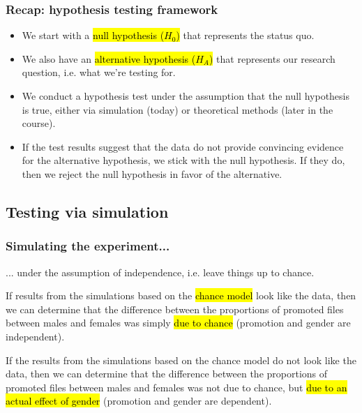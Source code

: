 \documentclass[slidestop,compress,mathserif]{beamer}
\begin{document}
\begin{frame}
\frametitle{Recap: hypothesis testing framework}

\begin{itemize}
\item We start with a \hl{null hypothesis ($H_0$)} that represents the status quo.
\item We also have an \hl{alternative hypothesis ($H_A$)} that represents our research question, i.e. what we're testing for.
\item We conduct a hypothesis test under the assumption that the null hypothesis is true, either via simulation (today) or theoretical methods (later in the course).
\item If the test results suggest that the data do not provide convincing evidence for the alternative hypothesis, we stick with the null hypothesis. If they do, then we reject the null hypothesis in favor of the alternative.
\end{itemize}

\end{frame}


\subsection{Testing via simulation}


\begin{frame}
\frametitle{Simulating the experiment...}

... under the assumption of independence, i.e. leave things up to chance. \\

\vspace{0.5cm}

If results from the simulations based on the \hl{chance model} look like the data, then we can determine that the difference between the proportions of promoted files between males and females was simply \hl{due to chance} (promotion and gender are independent). \\

\vspace{0.5cm}

If the results from the simulations based on the chance model do not look like the data, then we can determine that the difference between the proportions of promoted files between males and females was not due to chance, but \hl{due to an actual effect of gender} (promotion and gender are dependent).

\end{frame}
\end{document}
